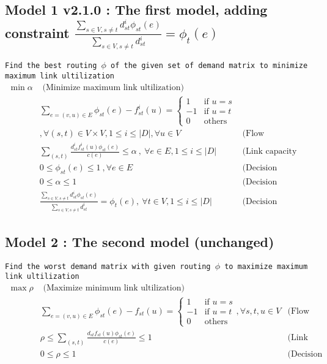 \documentclass{ctexart}
\begin{document}
\subsection{Model 1 v2.1.0 : The first model, adding constraint $\frac{\sum_{s\in V,s\not=t}d_{st}^i\phi_{st}(e)}{\sum_{s\in V,s\not=t}d_{st}^i}=\phi_t(e)$}
\texttt{Find the best routing $\phi$ of the given set of demand matrix to minimize maximum link ultilization} 
\begin{equation}
	\begin{aligned}
		\min \alpha & \text{  (Minimize maximum link ultilization)}\\
		& \sum_{e=(v,u)\in E}\phi_{st}(e)-f_{st}^i(u)=\begin{cases}
			1 &\text{if } u=s \\
			-1 &\text{if } u=t \\
			0 &\text{others} 
		 \end{cases}\\
		& ,\forall (s,t)\in V\times V,1\leq i\leq|\textit{D}| , \forall u\in V & \text{(Flow conservation)}\\
		& \sum_{(s,t)}\frac{
			d_{st}^if_{st}^i(u)\phi_{st}(e)}{c(e)} \leq \alpha\ ,\ \forall e\in E,1\leq i\leq|\textit{D}| &  \text{(Link capacity constraint)} \\
		& 0\leq\phi_{st}(e)\leq1\ ,\forall e\in E\ & \text{(Decision variable constraint)}\\
		& 0\leq\alpha\leq1\ & \text{(Decision variable constraint)} \\
		& \frac{\sum_{s\in V,s\not=t}d_{st}^i\phi_{st}(e)}{\sum_{s\in V,s\not=t}d_{st}^i}=\phi_t(e),\ \forall t\in V,1\leq i \leq |\textit{D}| & \text{(Decision variable constraint)}
	\end{aligned}
\end{equation}

\subsection{Model 2 : The second model (unchanged)}
\texttt{Find the worst demand matrix with given routing $\phi$  to maximize maximum link ultilization} 
\begin{equation}
	\begin{aligned}
		\max \rho & \text{  (Maximize minimum link ultilization)}\\
		& \sum_{e=(v,u)\in E}\phi_{st}(e)-f_{st}(u)=\begin{cases}
			1 &\text{if } u=s \\
			-1 &\text{if } u=t \\
			0 &\text{others} 
		 \end{cases},\forall s,t,u\in V & \text{(Flow conservation)}\\
		& \rho\leq\sum_{(s,t)}\frac{
			d_{st}f_{st}(u)\phi_{st}(e)}{c(e)} \leq 1\ &  \text{(Link capacity constraint)} \\
		& 0\leq\rho\leq1\ & \text{(Decision variable constraint)}
	\end{aligned}
\end{equation}
\end{document}
